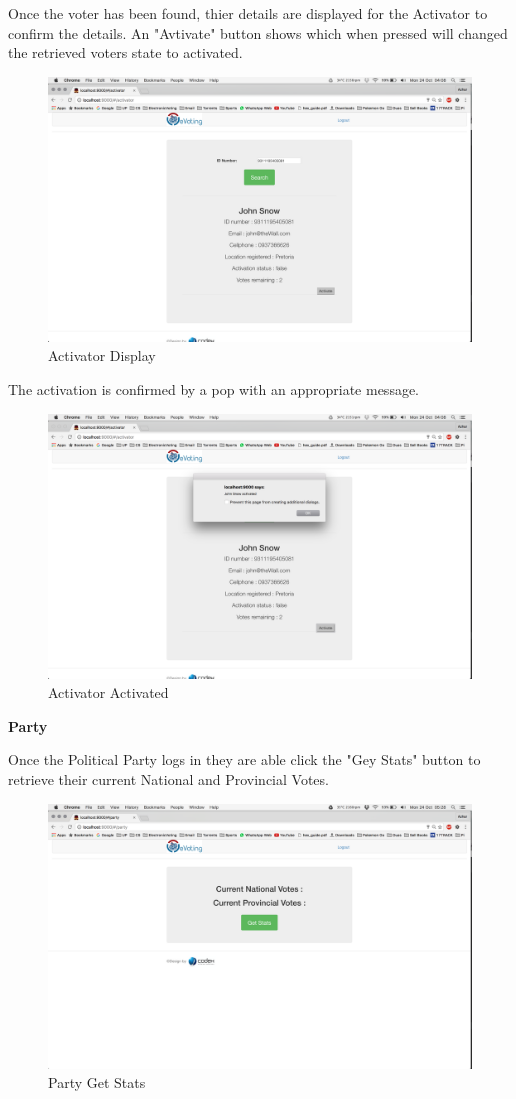 \documentclass[11pt]{article}
\begin{document}
		\newpage
		Once the voter has been found, thier details are displayed for the Activator to confirm the details. An "Avtivate" button shows which when pressed will changed the retrieved voters state to activated. 
		\begin{figure}[H]
			\centering
			\includegraphics[width=0.7\linewidth]{../Images/UserManual/activatorWeb/activatordisplay.png}
			\caption{Activator Display}
		\end{figure}
	
		The activation is confirmed by a pop with an appropriate message.  
		\begin{figure}[H]
			\centering
			\includegraphics[width=0.7\linewidth]{../Images/UserManual/activatorWeb/activatoractivated.png}
			\caption{Activator Activated}
		\end{figure}
		\newpage
		\textbf{Party} \newline
	
		Once the Political Party logs in they are able click the "Gey Stats" button to retrieve their current National and Provincial Votes. 
		\begin{figure}[H]
			\centering
			\includegraphics[width=0.7\linewidth]{../Images/UserManual/partyWeb/partygetstats.png}
			\caption{Party  Get Stats}
		\end{figure}
		
\end{document}
